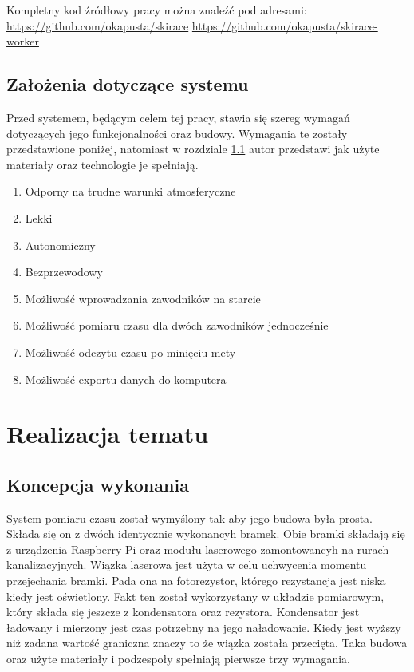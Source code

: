 \documentclass[11pt,a4paper, twoside]{article}
\begin{document}
\noindent
Kompletny kod źródłowy pracy można znaleźć pod adresami:
\newline
\url{https://github.com/okapusta/skirace}
\newline
\url{https://github.com/okapusta/skirace-worker}

\newpage

\newpage
\noindent
\subsection{Założenia dotyczące systemu}
Przed systemem, będącym celem tej pracy, stawia się szereg wymagań dotyczących jego funkcjonalności oraz budowy. Wymagania te zostały przedstawione poniżej, natomiast w rozdziale \ref{concept} autor przedstawi jak użyte materiały oraz technologie je spełniają.
\begin{enumerate}
\item Odporny na trudne warunki atmosferyczne
\item Lekki
\item Autonomiczny
\item Bezprzewodowy
\item \label{req:entry} Możliwość wprowadzania zawodników na starcie
\item \label{req:two} Możliwość pomiaru czasu dla dwóch zawodników jednocześnie
\item \label{req:lcd} Możliwość odczytu czasu po minięciu mety 
\item \label{req:export} Możliwość exportu danych do komputera
\end{enumerate}
\newpage
\section{Realizacja tematu}
\subsection{Koncepcja wykonania}\label{concept}
System pomiaru czasu został wymyślony tak aby jego budowa była prosta. Składa się on z dwóch identycznie wykonancyh bramek. Obie bramki składają się z urządzenia Raspberry Pi oraz modułu laserowego zamontowancyh na rurach kanalizacyjnych. Wiązka laserowa jest użyta w celu uchwycenia momentu przejechania bramki. Pada ona na fotorezystor, którego rezystancja jest niska kiedy jest oświetlony. Fakt ten został wykorzystany w układzie pomiarowym, który składa się jeszcze z kondensatora oraz rezystora. Kondensator jest ładowany i mierzony jest czas potrzebny na jego naładowanie. Kiedy jest wyższy niż zadana wartość graniczna znaczy to że wiązka została przecięta. Taka budowa oraz użyte materiały i podzespoły spełniają pierwsze trzy wymagania.
\end{document}
